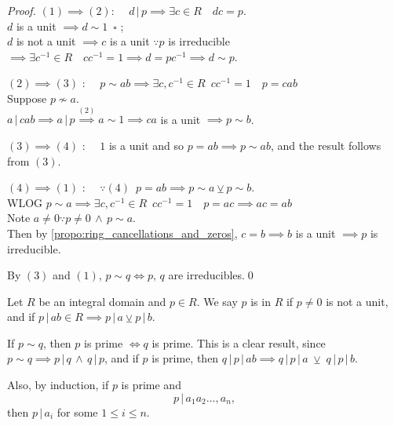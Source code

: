 \begin{proof}
  $(1) \implies (2)$: $\quad d \, | \, p \implies \exists c \in R \quad dc = p$. \\
  $d$ is a unit $\implies d \sim 1 \enspace \square$ ;\\
  $d$ is not a unit $\implies c$ is a unit $\because p$ is irreducible\\
  $\implies \exists c^{-1} \in R \quad cc^{-1} = 1 \implies d = pc^{-1} \implies d \sim p$.

  \noindent $(2) \implies (3)$ : $\quad p \sim ab \implies \exists c, c^{-1} \in R \enspace cc^{-1} = 1 \quad p = cab$\\
  Suppose $p \not\sim a$.\\
  $a \, | \, cab \implies a \, | \, p \overset{(2)}{\implies} a \sim 1 \implies ca$ is a unit $\implies p \sim b$.

  \noindent $(3) \implies (4)$ : $\quad 1$ is a unit and so $p = ab \implies p \sim ab$, and the result follows from $(3)$.

  \noindent $(4) \implies (1)$ : $\quad \because (4) \enspace p = ab \implies p \sim a \veebar p \sim b$.\\
  WLOG $p \sim a \implies \exists c, c^{-1} \in R \enspace cc^{-1} = 1 \quad p = ac\implies ac = ab$\\
  Note $a \neq 0 \because p \neq 0 \, \land \, p \sim a$. \\
  Then by \cref{propo:ring_cancellations_and_zeros}, $c = b \implies b$ is a unit $\implies p$ is irreducible.

  By $(3)$ and $(1)$, $p \sim q \iff p, \, q$ are irreducibles.\qed
\end{proof}

\begin{defn}[Prime]
\label{defn:prime}
  Let $R$ be an integral domain and $p \in R$. We say $p$ is  in $R$ if $p \neq 0$ is not a unit, and if $p \, | \, ab \in R \implies p \, | \, a \veebar p \, | \, b$.
\end{defn}

\begin{note}
  If $p \sim q$, then $p$ is prime $\iff q$ is prime. This is a clear result, since $p \sim q \implies p \, | \, q \, \land \, q \, | \, p$, and if $p$ is prime, then $q \, | \, p \, | \, ab \implies q \, | \, p \, | \, a \; \veebar \; q \, | \, p \, | \, b$.

  Also, by induction, if $p$ is prime and
  \begin{equation*}
    p \, | \, a_1 a_2 ..., a_n,
  \end{equation*}
  then $p \, | \, a_i$ for some $1 \leq i \leq n$.
\end{note}


